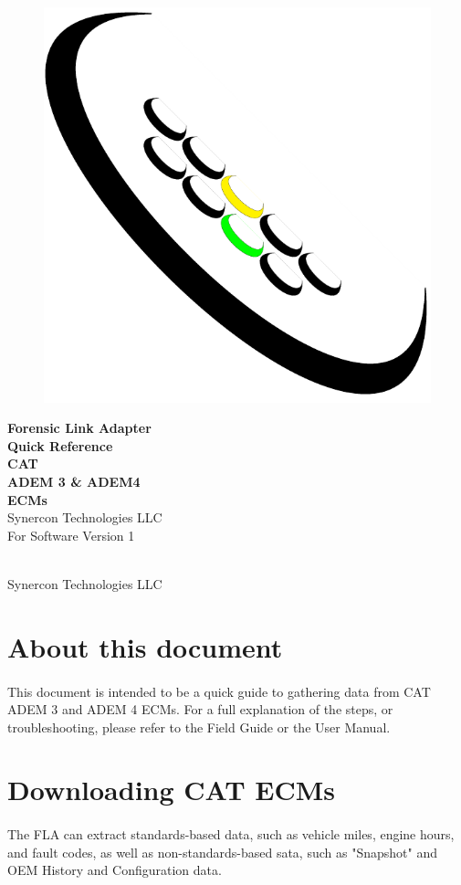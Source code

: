\documentclass[11pt]{article}
\newcommand*{\titleGP}{\begingroup %
\centering %
\vspace*{\baselineskip} %
\begin{figure}[tbph]
\centering
\includegraphics[width=0.15\linewidth]{../../media/logos/synercon_logo_v3_only}
\end{figure}
{\Huge \textbf{Forensic Link Adapter \\Quick Reference}}\\[2\baselineskip] %
{\Huge \textbf{CAT \\ADEM 3 \& ADEM4 \\[.4cm] ECMs}}\\[2\baselineskip] %
{\Huge Synercon Technologies LLC}\\[2\baselineskip]
{\Large For Software Version 1}\\[3cm]

\tableofcontents
\vfill %


\textcopyright {\scshape 2015} \\[0.3\baselineskip] %
Synercon Technologies LLC

\endgroup}
\begin{document}







\titleGP %

\newpage
\section{About this document}
\paragraph{  }
This document is intended to be a quick guide to gathering data from CAT ADEM 3 and ADEM 4 ECMs. For a full explanation of the steps, or troubleshooting, please refer to the Field Guide or the User Manual.

\section{Downloading CAT ECMs}
\paragraph{  }
The FLA can extract standards-based data, such as vehicle miles, engine hours, and fault codes, as well as non-standards-based sata, such as "Snapshot" and OEM History and Configuration data.
\end{document}
